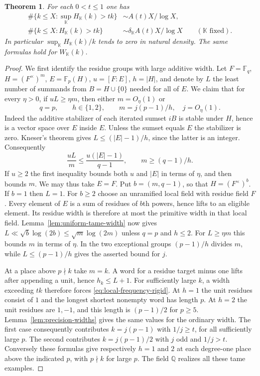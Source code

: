 \documentclass[11pt,letterpaper]{article}
\newtheorem{theorem}{Theorem}[section]
\theoremstyle{definition}
\numberwithin{equation}{section}
\begin{document}
\begin{theorem}\label{thm:local-frequency}
For each $0<t\le1$ one has
\begin{align*}
 \#\{k\le X:\sup_{\mathbb K}H_{\mathbb K}(k)>tk\}
       &\sim A(t)X/\log X,\\
 \#\{k\le X:H_{\mathbb K}(k)>tk\}
       &\sim \delta_{\mathbb K}A(t)X/\log X
                      \qquad(\mathbb K\text{ fixed}).
\end{align*}
In particular $\sup_{\mathbb K}H_{\mathbb K}(k)/k$ tends to zero
in natural density. The same formulas hold for $W_{\mathbb K}(k)$.
\end{theorem}

\begin{proof}
We first identify the residue groups with large additive width.
Let $F=\mathbb F_q$, $H=(F^\times)^m$, $E=\mathbb F_p(H)$,
$u=[F:E]$, $h=|H|$, and denote by $L$ the least number of summands
from $B=H\cup\{0\}$ needed for all of $E$. We claim that for every
$\eta>0$, if $uL\ge\eta m$, then either $m=O_\eta(1)$ or
\begin{equation}\label{eq:local-frequency-rigid}
   q=p,\qquad h\in\{1,2\},\qquad
   m=j(p-1)/h,\quad j=O_\eta(1).
\end{equation}
Indeed the additive stabilizer of each iterated sumset $iB$ is stable
under $H$, hence is a vector space over $E$ inside $E$. Unless the
sumset equals $E$ the stabilizer is zero. Kneser's theorem \cite{edkneser} gives
$L\le (|E|-1)/h$, since the latter is an integer. Consequently
\[
       \frac{uL}{m}\le\frac{u(|E|-1)}{q-1},
                  \qquad m\ge(q-1)/h.
\]
If $u\ge2$ the first inequality bounds both $u$ and $|E|$ in terms
of $\eta$, and then bounds $m$. We may thus take $E=F$.
Put $b=(m,q-1)$, so that $H=(F^\times)^b$. If $b=1$ then
$L=1$. For $b\ge2$ choose an unramified local field with residue
field $F$. Every element of $E$ is a sum of residues of $b$th
powers, hence lifts to an eligible element. Its residue width is
therefore at most the primitive width in that local field.
Lemma~\ref{lem:uniform-tame-width} now gives
$L\ll\sqrt b\log(2b)\le\sqrt m\log(2m)$ unless $q=p$ and
$h\le2$. For $L\ge\eta m$ this bounds $m$ in terms of $\eta$.
In the two exceptional groups $(p-1)/h$ divides $m$, while
$L\le(p-1)/h$ gives the asserted bound for $j$.

At a place above $p\nmid k$ take $m=k$. A word for a residue target
minus one lifts after appending a unit, hence $h_k\le L+1$.
For sufficiently large $k$, a width exceeding $tk$ therefore forces
\eqref{eq:local-frequency-rigid}. At $h=1$ the unit residues
consist of $1$ and the longest shortest nonempty word has length $p$.
At $h=2$ the unit residues are $1,-1$, and this length is $(p-1)/2$
for $p\ge5$. Lemma~\ref{lem:precision-widths} gives the same
values for the ordinary width. The first case consequently contributes
$k=j(p-1)$ with $1/j\ge t$, for all sufficiently large $p$.
The second contributes $k=j(p-1)/2$ with $j$ odd and $1/j>t$.
Conversely these formulas give respectively $h=1$ and $2$ at each
degree-one place above the indicated $p$, with $p\nmid k$ for
large $p$. The field $\mathbb Q$ realizes all these tame examples.


\end{proof}
\end{document}
